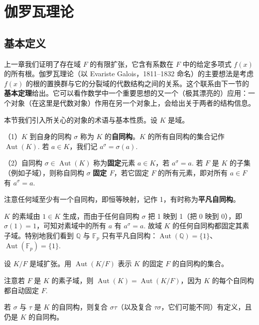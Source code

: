 
\setcounter{chapter}{13}

\chapter{伽罗瓦理论}

\section{基本定义}

上一章我们证明了存在域 \(F\) 的有限扩张，它含有系数在 \(F\) 中的给定多项式 \(f(x)\) 的所有根。伽罗瓦理论（以 Evariste Galois，1811--1832 命名）的主要想法是考虑 \(f(x)\) 的根的置换群与它的分裂域的代数结构之间的关系。这个联系由下一节的\textbf{基本定理}给出。它可以看作数学中一个重要思想的又一个（极其漂亮的）应用：一个对象（在这里是代数对象）作用在另一个对象上，会给出关于两者的结构信息。

本节我们引入所关心的对象的术语与基本性质。设 \(K\) 是域。

\begin{definition}
（1）\(K\) 到自身的同构 \(\sigma\) 称为 \(K\) 的\textbf{自同构}。\(K\) 的所有自同构的集合记作 \(\operatorname{Aut}(K)\). 若 \(a \in K\)，我们记 \(a^\sigma = \sigma(a)\).

（2）自同构 \(\sigma \in \operatorname{Aut}(K)\) 称为\textbf{固定}元素 \(a \in K\)，若 \(a^\sigma = a\). 若 \(F\) 是 \(K\) 的子集（例如子域），则称自同构 \(\sigma\) \textbf{固定 \(F\)}，若它固定 \(F\) 的所有元素，即对所有 \(a \in F\) 有 \(a^\sigma = a\).
\end{definition}

注意任何域至少有一个自同构，即恒等映射，记作 1，有时称为\textbf{平凡自同构}。

\(K\) 的素域由 \(1 \in K\) 生成，而由于任何自同构 \(\sigma\) 把 1 映到 1（把 0 映到 0），即 \(\sigma(1) = 1\)，可知对素域中的所有 \(a\) 有 \(a^\sigma = a\). 故域 \(K\) 的任何自同构都固定其素子域。特别地我们看到 \(\mathbb{Q}\) 与 \(\mathbb{F}_p\) 只有平凡自同构：\(\operatorname{Aut}(\mathbb{Q}) = \{1\}\)、\(\operatorname{Aut}(\mathbb{F}_p) = \{1\}\).

\begin{definition}
设 \(K/F\) 是域扩张。用 \(\operatorname{Aut}(K/F)\) 表示 \(K\) 的固定 \(F\) 的自同构的集合。
\end{definition}

注意若 \(F\) 是 \(K\) 的素子域，则 \(\operatorname{Aut}(K) = \operatorname{Aut}(K/F)\)，因为 \(K\) 的每个自同构都自动固定 \(F\).

若 \(\sigma\) 与 \(\tau\) 是 \(K\) 的自同构，则复合 \(\sigma\tau\)（以及复合 \(\tau\sigma\)，它们可能不同）有定义，且仍是 \(K\) 的自同构。


